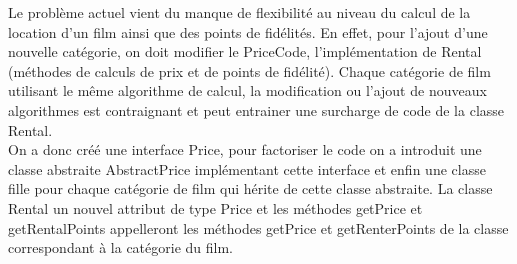 \documentclass[%
a4paper,
11pt
]{article}
\begin{document}
Le problème actuel vient du manque de flexibilité au niveau du calcul de la location d'un film ainsi que des points de fidélités. En effet, pour l'ajout d'une nouvelle catégorie, on doit modifier le PriceCode, l'implémentation de Rental (méthodes de calculs de prix et de points de fidélité). Chaque catégorie de film utilisant le même algorithme de calcul, la modification ou l'ajout de nouveaux algorithmes est contraignant et peut entrainer une surcharge de code de la classe Rental.\\
On a donc créé une interface Price, pour factoriser le code on a introduit une classe abstraite AbstractPrice implémentant cette interface et enfin une classe fille pour chaque catégorie de film qui hérite de cette classe abstraite. La classe Rental un nouvel attribut de type Price et les méthodes getPrice et getRentalPoints appelleront les méthodes getPrice et getRenterPoints de la classe correspondant à la catégorie du film.
\end{document}
